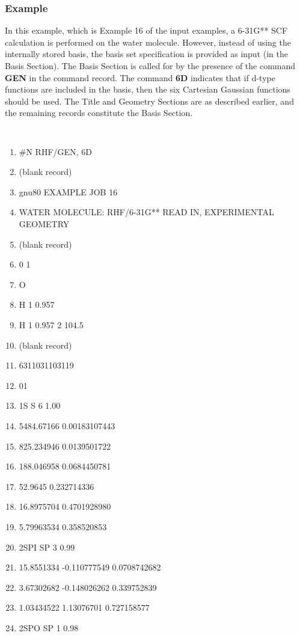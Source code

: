 \subsubsection{\sf Example}
In this example, 
which is Example 16 of the input examples,
a 6-31G** SCF calculation is performed on the water
molecule.  However, instead of using the internally stored basis, the
basis set specification is provided as input (in the Basis Section).
The Basis Section is called for by the presence of the command 
{\bf GEN} in the
command record.  The command {\bf 6D}
indicates that if d-type functions are included in the basis, then the six
Cartesian Gaussian functions should be used.  The Title and Geometry
Sections are as described earlier, and the remaining records  constitute the
Basis Section.
%
{\small
{\tt
\begin{enumerate}
\item \#N RHF/GEN, 6D
\item (blank record)
\item gnu80 EXAMPLE JOB  16
\item WATER MOLECULE: RHF/6-31G** READ IN, EXPERIMENTAL GEOMETRY
\item (blank record) 
\item 0 1
\item O
\item H 1 0.957
\item H 1 0.957 2 104.5
\item  (blank record)
\item 6311031103119
\item 01
\item         1S   S 6 1.00
\item 5484.67166           0.00183107443
\item  825.234946           0.0139501722
\item  188.046958           0.0684450781
\item 52.9645              0.232714336
\item  16.8975704           0.4701928980
\item 5.79963534           0.358520853
\item       2SPI  SP 3 0.99
\item  15.8551334          -0.110777549         0.0708742682
\item 3.67302682          -0.148026262         0.339752839
\item 1.03434522           1.13076701          0.727158577
\item       2SPO  SP 1 0.98

\end{enumerate}}}
